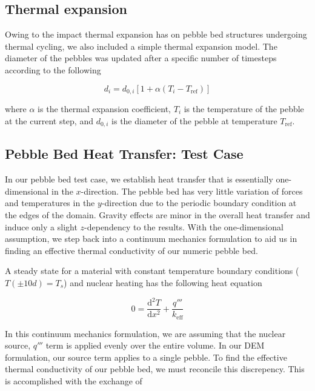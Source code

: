 \subsection{Thermal expansion}
Owing to the impact thermal expansion has on pebble bed structures undergoing thermal cycling\cite{Tanigawa:2010cr, Vargas2007, Chen2009}, we also included a simple thermal expansion model.  The diameter of the pebbles was updated after a specific number of timesteps according to the following

\begin{equation}
	d_i = d_{0,i}\left[1+\alpha\left(T_i - T_\text{ref}\right)\right]
\end{equation}

where $\alpha$ is the thermal expansion coefficient, $T_i$ is the temperature of the pebble at the current step, and $d_{0,i}$ is the diameter of the pebble at temperature $T_\text{ref}$.






\subsection{Pebble Bed Heat Transfer: Test Case}
In our pebble bed test case, we establish heat transfer that is essentially one-dimensional in the $x$-direction. The pebble bed has very little variation of forces and temperatures in the $y$-direction due to the periodic boundary condition at the edges of the domain. Gravity effects are minor in the overall heat transfer and induce only a slight $z$-dependency  to the results. With the one-dimensional assumption, we step back into a continuum mechanics formulation to aid us in finding an effective thermal conductivity of our numeric pebble bed. 

A steady state for a material with constant temperature boundary conditions ($T(\pm 10d) = T_s$) and nuclear heating has the following heat equation

\begin{equation}\label{eq:continuum-heateqn}
	0 = \frac{\mathrm{d}^2T}{\mathrm{d}x^2} + \frac{q'''}{k_\text{eff}}
\end{equation}

In this continuum mechanics formulation, we are assuming that the nuclear source, $q'''$ term is applied evenly over the entire volume. In our DEM formulation, our source term applies to a single pebble. To find the effective thermal conductivity of our pebble bed, we must reconcile this discrepency. This is accomplished  with the exchange of

